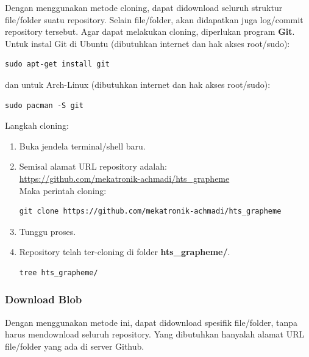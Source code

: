 \documentclass[12pt,]{article}
\begin{document}
	Dengan menggunakan metode cloning, dapat didownload seluruh struktur file/folder suatu repository.
	Selain file/folder, akan didapatkan juga log/commit repository tersebut. 
	Agar dapat melakukan cloning, diperlukan program \textbf{Git}.
	Untuk instal Git di Ubuntu (dibutuhkan internet dan hak akses root/sudo):
	\begin{verbatim}
sudo apt-get install git
	\end{verbatim}
	
	dan untuk Arch-Linux (dibutuhkan internet dan hak akses root/sudo):
	\begin{verbatim}
sudo pacman -S git
	\end{verbatim}
	
	Langkah cloning:
	\begin{enumerate}
		\item Buka jendela terminal/shell baru.
		
		\item Semisal alamat URL repository adalah:\\
		\url{https://github.com/mekatronik-achmadi/hts_grapheme} \\
		Maka perintah cloning:
		\begin{verbatim}
git clone https://github.com/mekatronik-achmadi/hts_grapheme
		\end{verbatim}
		
		\item Tunggu proses.
		
		\item Repository telah ter-cloning di folder \textbf{hts\_grapheme/}.
		\begin{verbatim}
tree hts_grapheme/
		\end{verbatim}
		
	\end{enumerate}
	
	\newpage
	\subsubsection{Download Blob}
	
	Dengan menggunakan metode ini, dapat didownload spesifik file/folder,
	tanpa harus mendownload seluruh repository.
	Yang dibutuhkan hanyalah alamat URL file/folder yang ada di server Github.
	
\end{document}
